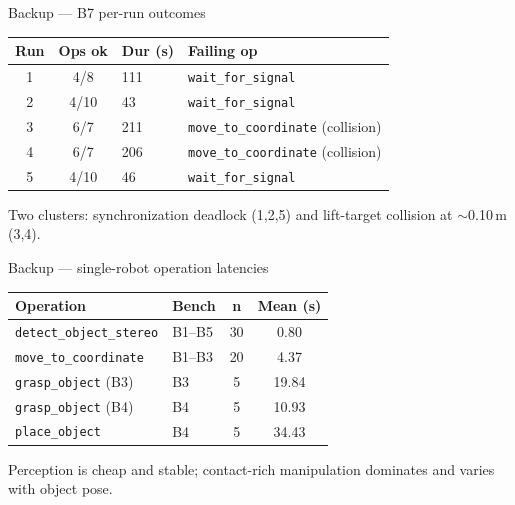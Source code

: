 \documentclass[aspectratio=169,11pt]{beamer}
\begin{document}
\appendix

\begin{frame}{Backup --- B7 per-run outcomes}
	\begin{table}\footnotesize
		\begin{tabular}{ccll}
			\toprule
			\textbf{Run} & \textbf{Ops ok} & \textbf{Dur (s)} & \textbf{Failing op}                       \\
			\midrule
			1            & 4/8             & 111              & \texttt{wait\_for\_signal}                \\
			2            & 4/10            & 43               & \texttt{wait\_for\_signal}                \\
			3            & 6/7             & 211              & \texttt{move\_to\_coordinate} (collision) \\
			4            & 6/7             & 206              & \texttt{move\_to\_coordinate} (collision) \\
			5            & 4/10            & 46               & \texttt{wait\_for\_signal}                \\
			\bottomrule
		\end{tabular}
	\end{table}
	\footnotesize Two clusters: synchronization deadlock (1,2,5) and lift-target collision at $\sim$0.10\,m (3,4).
\end{frame}

\begin{frame}{Backup --- single-robot operation latencies}
	\begin{table}\footnotesize
		\begin{tabular}{llcc}
			\toprule
			\textbf{Operation}              & \textbf{Bench} & \textbf{n} & \textbf{Mean (s)} \\
			\midrule
			\texttt{detect\_object\_stereo} & B1--B5         & 30         & 0.80              \\
			\texttt{move\_to\_coordinate}   & B1--B3         & 20         & 4.37              \\
			\texttt{grasp\_object} (B3)     & B3             & 5          & 19.84             \\
			\texttt{grasp\_object} (B4)     & B4             & 5          & 10.93             \\
			\texttt{place\_object}          & B4             & 5          & 34.43             \\
			\bottomrule
		\end{tabular}
	\end{table}
	\footnotesize Perception is cheap and stable; contact-rich manipulation dominates and varies with object pose.
\end{frame}
\end{document}
